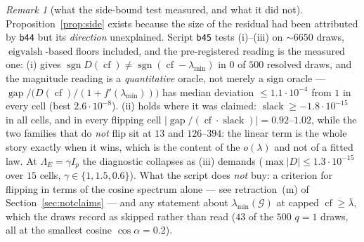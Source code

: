 \documentclass[11pt]{article}
\theoremstyle{remark}
\newtheorem{remark}{Remark}[section]
\newcommand{\Gr}{\mathcal{G}}
\newcommand{\Le}{\Lambda_E}
\begin{document}
\begin{remark}[what the side-bound test measured, and what it did not]\label{rem:side}
Proposition~\ref{prop:side} exists because the size of the residual had been attributed by \texttt{b44}
but its \emph{direction} unexplained. Script \texttt{b45} tests (i)--(iii) on ${\sim}6650$ draws,
$\operatorname{eigvalsh}$-based floors included, and the pre-registered reading is the measured one:
(i) gives $\operatorname{sgn}D(\operatorname{cf})\ne\operatorname{sgn}(\operatorname{cf}-\lambda_{\min})$
in $0$ of $500$ resolved draws, and the magnitude reading is a \emph{quantitative} oracle, not merely a
sign oracle --- $\operatorname{gap}\big/\bigl(D(\operatorname{cf})/(1+f'(\lambda_{\min}))\bigr)$ has
median deviation $\le1.1\cdot10^{-4}$ from $1$ in every cell (best $2.6\cdot10^{-8}$). (ii) holds where
it was claimed: $\operatorname{slack}\ge-1.8\cdot10^{-15}$ in all cells, and in every flipping cell
$|\operatorname{gap}/(\operatorname{cf}\cdot\operatorname{slack})|=0.92$--$1.02$, while the two families
that do \emph{not} flip sit at $13$ and $126$--$394$: the linear term is the whole story exactly when it
wins, which is the content of the $o(\lambda)$ and not of a fitted law. At $\Le=\gamma I_p$ the
diagnostic collapses as (iii) demands ($\max|D|\le1.3\cdot10^{-15}$ over $15$ cells,
$\gamma\in\{1,1.5,0.6\}$). What the script does \emph{not} buy: a criterion for flipping in terms of
the cosine spectrum alone --- see retraction~(m) of Section~\ref{sec:notclaims} --- and any statement about
$\lambda_{\min}(\Gr)$ at capped $\operatorname{cf}\ge\bar\lambda$, which the draws record as skipped
rather than read ($43$ of the $500$ $q=1$ draws, all at the smallest cosine $\cos\alpha=0.2$).
\end{remark}
\end{document}
